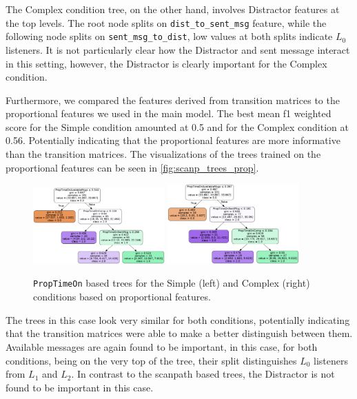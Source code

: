 The Complex condition tree, on the other hand, involves Distractor features at the top levels. The root node splits on \texttt{dist\_to\_sent\_msg} feature, while the following node splits on \texttt{sent\_msg\_to\_dist}, low values at both splits indicate $L_0$ listeners. It is not particularly clear how the Distractor and sent message interact in this setting, however, the Distractor is clearly important for the Complex condition.


Furthermore, we compared the features derived from transition matrices to the proportional features we used in the main model. The best mean f1 weighted score for the Simple condition amounted at 0.5 and for the Complex condition at 0.56. Potentially indicating that the proportional features are more informative than the transition matrices. The visualizations of the trees trained on the proportional features can be seen in \autoref{fig:scanp_trees_prop}. 

\begin{figure}
    \centering
    \includegraphics[width=0.45\textwidth]{images/tree_classifier_prop_simple.png}
    \includegraphics[width=0.45\textwidth]{images/tree_classifier_prop_complex.png}
    \caption{\texttt{PropTimeOn} based trees for the Simple (left) and Complex (right) conditions based on proportional features.}
    \label{fig:scanp_trees_prop}
\end{figure}

The trees in this case look very similar for both conditions, potentially indicating that the transition matrices were able to make a better distinguish between them. Available messages are again found to be important, in this case, for both conditions, being on the very top of the tree, their split distinguishes $L_0$ listeners from $L_1$ and $L_2$. In contrast to the scanpath based trees, the Distractor is not found to be important in this case. 



